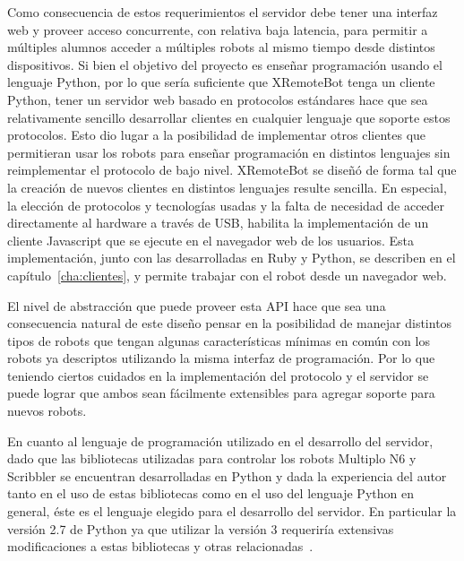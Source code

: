 Como consecuencia de estos requerimientos el servidor
debe tener una interfaz web y proveer acceso concurrente, con relativa
baja latencia, para permitir a múltiples alumnos acceder a múltiples robots
al mismo tiempo desde distintos dispositivos.
Si bien el objetivo del proyecto \proyecto{} es enseñar
programación usando el lenguaje Python, por lo que sería suficiente
que XRemoteBot tenga un cliente Python, tener un servidor web basado en
protocolos estándares hace que sea relativamente sencillo desarrollar
clientes en cualquier lenguaje
que soporte estos protocolos. Esto dio lugar a la posibilidad de
implementar otros clientes que permitieran usar los robots para enseñar
programación en distintos lenguajes sin reimplementar el protocolo
de bajo nivel. XRemoteBot se diseñó de forma tal que la creación
de nuevos clientes en distintos lenguajes resulte sencilla.
En especial, la elección de protocolos y tecnologías usadas
y la falta de necesidad de acceder directamente al hardware a través de USB,
habilita la implementación de un cliente Javascript que se ejecute en el
navegador web de los usuarios. Esta implementación, junto con las desarrolladas
en Ruby y Python, se describen en el capítulo~\ref{cha:clientes}, y permite
trabajar con el robot desde un navegador web.

El nivel de abstracción que puede proveer esta API hace que sea
una consecuencia natural de este diseño pensar
en la posibilidad de manejar distintos tipos de robots
que tengan algunas características mínimas en común con los robots ya
descriptos utilizando la misma interfaz de programación. Por lo que
teniendo ciertos cuidados en la implementación del protocolo y el
servidor se puede lograr que ambos sean fácilmente extensibles para
agregar soporte para nuevos robots.

En cuanto al lenguaje de programación utilizado en el desarrollo del servidor,
dado que las bibliotecas utilizadas para controlar los robots Multiplo N6 y
Scribbler se encuentran desarrolladas en Python y dada la experiencia del autor
tanto en el uso de estas bibliotecas como en el uso del lenguaje Python en general,
éste es el lenguaje elegido para el desarrollo del servidor. En particular la
versión 2.7 de Python ya que utilizar la versión 3 requeriría extensivas
modificaciones a estas bibliotecas y otras relacionadas~\citep{lutz_2014}.
